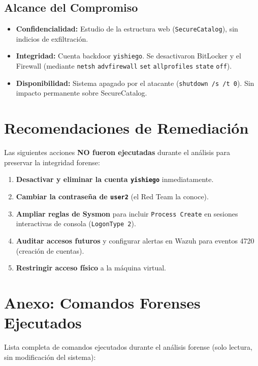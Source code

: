 \subsection{Alcance del Compromiso}
\begin{itemize}
    \item \textbf{Confidencialidad:} Estudio de la estructura web (\texttt{Secure}\allowbreak\texttt{Catalog}), sin indicios de exfiltración.
    \item \textbf{Integridad:} Cuenta backdoor \texttt{yishiego}. Se desactivaron BitLocker y el Firewall (mediante \newline \texttt{netsh} \texttt{advfirewall} \texttt{set} \texttt{allprofiles} \texttt{state} \texttt{off}).
    \item \textbf{Disponibilidad:} Sistema apagado por el atacante (\texttt{shutdown /s /t 0}). Sin impacto permanente sobre SecureCatalog.
\end{itemize}

\section{Recomendaciones de Remediación}
Las siguientes acciones \textbf{NO fueron ejecutadas} durante el análisis para preservar la integridad forense:
\begin{enumerate}
    \item \textbf{Desactivar y eliminar la cuenta \texttt{yishiego}} inmediatamente.
    \item \textbf{Cambiar la contraseña de \texttt{user2}} (el Red Team la conoce).
    \item \textbf{Ampliar reglas de Sysmon} para incluir \texttt{Process Create} en sesiones interactivas de consola (\texttt{LogonType 2}).
    \item \textbf{Auditar accesos futuros} y configurar alertas en Wazuh para eventos 4720 (creación de cuentas).
    \item \textbf{Restringir acceso físico} a la máquina virtual.
\end{enumerate}

\section{Anexo: Comandos Forenses Ejecutados}
Lista completa de comandos ejecutados durante el análisis forense (solo lectura, sin modificación del sistema):


